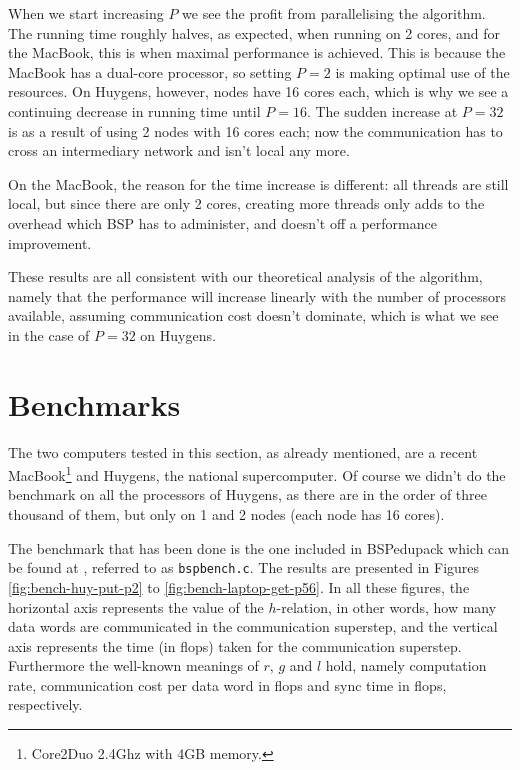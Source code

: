 \documentclass[a4paper]{article}
\begin{document}
When we start increasing $P$ we see the profit from parallelising the algorithm.
The running time roughly halves, as expected, when running on 2 cores, and for
the MacBook, this is when maximal performance is achieved. This is because the
MacBook has a dual-core processor, so setting $P=2$ is making optimal use of the
resources. On Huygens, however, nodes have 16 cores each, which is why we see a
continuing decrease in running time until $P=16$. The sudden increase at $P=32$
is as a result of using 2 nodes with 16 cores each; now the communication has to
cross an intermediary network and isn't local any more. 

On the MacBook, the reason for the time increase is different: all threads are
still local, but since there are only 2 cores, creating more threads only adds
to the overhead which BSP has to administer, and doesn't off a performance
improvement. 

These results are all consistent with our theoretical analysis of the algorithm,
namely that the performance will increase linearly with the number of processors
available, assuming communication cost doesn't dominate, which is what we see in
the case of $P=32$ on Huygens. 

\section{Benchmarks}\label{sec:bench}

The two computers tested in this section, as already mentioned, are a recent
MacBook\footnote{Core2Duo 2.4Ghz with 4GB memory.} and Huygens, the national
supercomputer. Of course we didn't do the benchmark on all the processors of Huygens,
as there are in the order of three thousand of them, but only on 1 and 2 nodes
(each node has 16 cores). 

The benchmark that has been done is the one included in BSPedupack which can be
found at \cite{edupack}, referred to as \texttt{bspbench.c}. The results are
presented in Figures \ref{fig:bench-huy-put-p2} to
\ref{fig:bench-laptop-get-p56}. In all these figures, the horizontal axis
represents the value of the $h$-relation, in other words, how many data words
are communicated in the communication superstep, and the vertical axis
represents the time (in flops) taken for the communication superstep.
Furthermore the well-known meanings of $r$, $g$ and $l$ hold, namely computation
rate, communication cost per data word in flops and sync time in flops,
respectively. 
\end{document}
